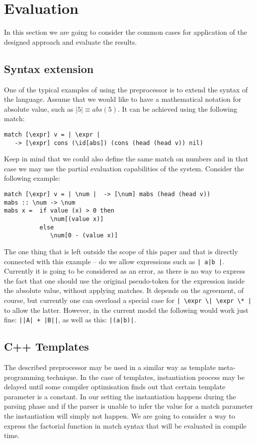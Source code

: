 \section{Evaluation}

In this section we are going to consider the common cases for
application of the designed approach and evaluate the results.

\subsection{Syntax extension}

One of the typical examples of using the preprocessor is to extend the
syntax of the language.  Assume that we would like to have a mathematical 
notation for absolute value, such as $\left|5\right| \equiv abs(5)$. 
It can be achieved using the following match:
\begin{verbatim}
match [\expr] v = | \expr | 
   -> [\expr] cons (\id[abs]) (cons (head (head v)) nil)
\end{verbatim}

Keep in mind that we could also define the same match on numbers
and in that case we may use the partial evaluation capabilities of 
the system.  Consider the following example:
\begin{verbatim}
match [\expr] v = | \num |  -> [\num] mabs (head (head v))
mabs :: \num -> \num
mabs x =  if value (x) > 0 then
             \num[(value x)]
          else
             \num[0 - (value x)]
\end{verbatim}

The one thing that is left outside the scope of this paper and that 
is directly connected with this example -- do we allow expressions such as
\verb/| a|b |/.  Currently it is going to be considered as an error, as there is
no way to express the fact that one should use the original pseudo-token
for the expression inside the absolute value,
without applying matches.  It depends on the agreement, of course,
but currently one can overload a special case for 
\verb/| \expr \| \expr \* |/ to allow the latter.  However, in the
current model the following would work just fine: \verb/||A| + |B||/, 
as well as this: \verb/|(a|b)|/.

\subsection{C++ Templates}

The described preprocessor may be used in a similar way as template
meta-programming technique.  In the case of templates, instantiation process
may be delayed until some compiler optimisation finds out that certain template
parameter is a constant.  In our setting the instantiation happens during the
parsing phase and if the parser is unable to infer the value for a match
parameter the instantiation will simply not happen.  We are going to consider a
way to express the factorial function in match syntax that will be evaluated in
compile time.

